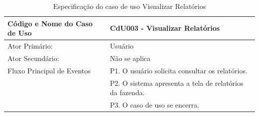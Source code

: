 \documentclass[12pt]{article}
\begin{document}
\begin{table}[!h]
	\begin{center}
		\caption{Especificação do caso de uso Visualizar Relatórios}
		\begin{tabular}{ | l |  p{10cm} |}
			\hline
			Código e Nome do Caso de Uso & CdU003 - Visualizar Relatórios \\ \hline
			Ator Primário: & Usuário \\ 
			Ator Secundário: & Não se aplica \\ \hline
			Fluxo Principal de Eventos & P1. O usuário solicita consultar os relatórios. \\
						   & P2. O sistema apresenta a tela de relatórios da fazenda. \\
						   & P3. O caso de uso se encerra. \\
			\hline
		\end{tabular}
	\end{center}
\end{table}

\newpage
\end{document}

